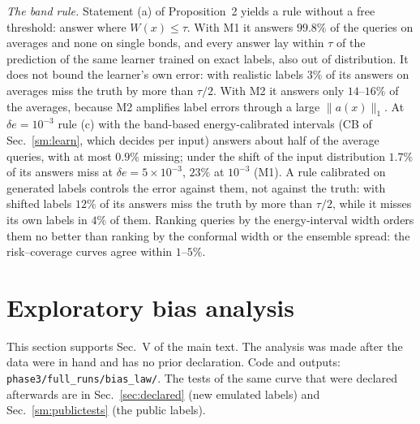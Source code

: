 \documentclass[aps,prx,onecolumn,10pt,nofootinbib,longbibliography,floatfix]{revtex4-2}
\theoremstyle{remark}
\newcommand{\de}{\delta e}
\begin{document}
\emph{The band rule.} Statement (a) of Proposition~2 yields a rule without a free threshold: answer where %
$W(x)\le\tau$. With M1 it answers $99.8\%$ of the queries on averages and none on single bonds, and every answer lay %
within $\tau$ of the prediction of the same learner trained on exact labels, also out of distribution. It does not
bound the learner's own error: with realistic labels $3\%$ of its answers on averages miss the truth by more than %
$\tau/2$. With M2 it answers only $14$--$16\%$ of the averages, because M2 amplifies label errors through a large %
$\|a(x)\|_1$. At $\de=10^{-3}$ rule (c) with the band-based energy-calibrated intervals (CB of Sec.~\ref{sm:learn}, which decides per input) answers about half of the average queries, with at most %
$0.9\%$ missing; under the shift of the input distribution $1.7\%$ of its answers miss at $\de=5\times10^{-3}$, %
$23\%$ at $10^{-3}$ (M1). A rule calibrated on generated labels controls the error against them, not against the %
truth: with shifted labels $12\%$ of its answers miss the truth by more than $\tau/2$, while it misses its own labels %
in $4\%$ of them. Ranking queries by the energy-interval width orders them no better than ranking by the conformal width %
or the ensemble spread: the risk--coverage curves agree within $1$--$5\%$. %

\section{Exploratory bias analysis}
\label{sec:biaslaw}

This section supports Sec.~V of the main text. The analysis was made after the data were in hand and has no prior
declaration. Code and outputs: \texttt{phase3/full\_runs/bias\_law/}. The tests of the same curve that were declared
afterwards are in Sec.~\ref{sec:declared} (new emulated labels) and Sec.~\ref{sm:publictests} (the public labels).
\end{document}
